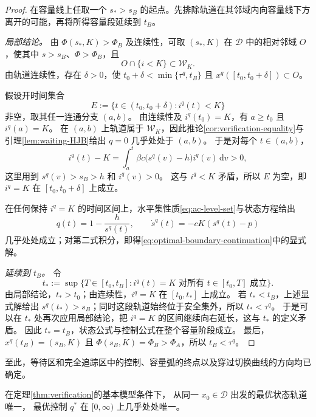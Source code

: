 \documentclass[lang=cn,a4paper,newtx]{elegantpaper}
\theoremstyle{plain}
\theoremstyle{definition}
\newcommand{\Dcal}{\mathcal D}
\newcommand{\dd}{\,\mathrm d}
\begin{document}
\begin{proof}
在容量线上任取一个 $s_*>s_B$ 的起点。先排除轨道在其邻域内向容量线下方离开的可能，再将所得容量段延续到 $t_B$。

\emph{局部结论。}
由 $\Phi(s_*,K)>\Phi_B$ 及连续性，可取 $(s_*,K)$ 在 $\Dcal$ 中的相对邻域 $O$，使其中 $s>s_B$、$\Phi>\Phi_B$，且
\[
O\cap\{i<K\}\subset\mathcal W_K.
\]
由轨道连续性，存在 $\delta>0$，使 $t_0+\delta<\min\{\tau^q,t_B\}$ 且 $x^q([t_0,t_0+\delta])\subset O$。

假设开时间集合
\[
E:=\{t\in(t_0,t_0+\delta):i^q(t)<K\}
\]
非空，取其任一连通分支 $(a,b)$。
由连续性及 $i^q(t_0)=K$，有 $a\ge t_0$ 且 $i^q(a)=K$。
在 $(a,b)$ 上轨道属于 $\mathcal W_K$，因此推论\ref{cor:verification-equality}与引理\ref{lem:waiting-HJB}给出 $q=0$ 几乎处处于 $(a,b)$。
于是对每个 $t\in(a,b)$，
\[
i^q(t)-K
=\int_a^t \beta c\bigl(s^q(v)-h\bigr)i^q(v)\dd v>0,
\]
这里用到 $s^q(v)>s_B>h$ 和 $i^q(v)>0$。
这与 $i^q<K$ 矛盾，所以 $E$ 为空，即 $i^q=K$ 在 $[t_0,t_0+\delta]$ 上成立。

在任何保持 $i^q=K$ 的时间区间上，水平集性质\eqref{eq:ac-level-set}与状态方程给出
\[
q(t)=1-\frac{h}{s^q(t)},\qquad
\dot s^q(t)=-cK(s^q(t)-p)
\]
几乎处处成立；对第二式积分，即得\eqref{eq:optimal-boundary-continuation}中的显式解。

\emph{延续到 $t_B$。}
令
\[
t_*:=\sup\{T\in[t_0,t_B]:
 i^q(t)=K\text{ 对所有 }t\in[t_0,T]\text{ 成立}\}.
\]
由局部结论，$t_*>t_0$；由连续性，$i^q=K$ 在 $[t_0,t_*]$ 上成立。
若 $t_*<t_B$，上述显式解给出 $s^q(t_*)>s_B$；同时这段轨道始终位于安全集外，所以 $t_*<\tau^q$。
于是可以在 $t_*$ 处再次应用局部结论，把 $i^q=K$ 的区间继续向右延长，这与 $t_*$ 的定义矛盾。
因此 $t_*=t_B$，状态公式与控制公式在整个容量阶段成立。
最后，$x^q(t_B)=(s_B,K)$ 且 $\Phi(s_B,K)=\Phi_B>\Phi_A$，所以 $t_B<\tau^q$。
\end{proof}

至此，等待区和完全追踪区中的控制、容量弧的终点以及穿过切换曲线的方向均已确定。

\begin{theorem}[最优轨道与控制的唯一性]
\label{thm:unique-q}
在定理\ref{thm:verification}的基本模型条件下，
从同一 $x_0\in\Dcal$ 出发的最优状态轨道唯一，
最优控制 $q^*$ 在 $[0,\infty)$ 上几乎处处唯一。
\end{theorem}
\end{document}
